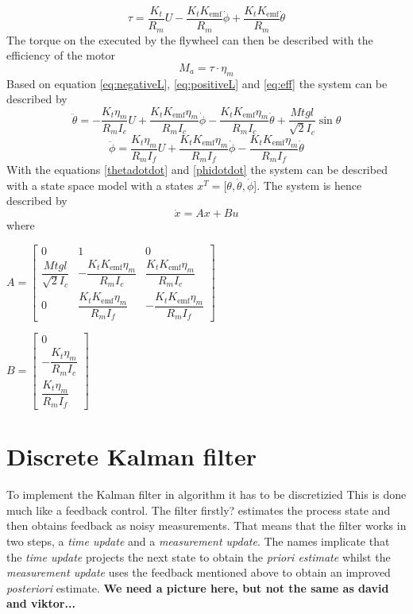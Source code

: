 \documentclass[a4paper,11pt]{kth-mag}
\begin{document}
\begin{equation} \label{eq:tau}
\tau = \frac{K_t}{R_m} U - \frac{K_t K_{\text{emf}} }{R_m} \dot{\phi} + \frac{K_t K_{\text{emf}} }{R_m} \dot{\theta}
\end{equation}
The torque on the executed by the flywheel can then be described with the efficiency of the motor
\begin{equation} \label{eq:eff}
M_a = \tau \cdot \eta_m
\end{equation}
Based on equation \eqref{eq:negativeL}, \eqref{eq:positiveL} and \eqref{eq:eff} the system can be described by
\begin{equation}
\ddot{\theta} = -\frac{K_t \eta_m}{R_m I_c} U + \frac{K_t K_{\text{emf}} \eta_m}{R_m I_c} \dot{\phi} - \frac{K_t K_{\text{emf}} \eta_m}{R_m I_c} \dot{\theta} + \frac{Mt g l }{\sqrt{2} I_c} \sin \theta \label{thetadotdot}
\end{equation}
\begin{equation}
\ddot{\phi} = \frac{K_t \eta_m}{R_m I_f} U + \frac{K_t K_{\text{emf}} \eta_m}{R_m I_f} \dot{\phi} - \frac{K_t K_{\text{emf}} \eta_m}{R_m I_f} \dot{\theta} 
\label{phidotdot}
\end{equation} 
With the equations \eqref{thetadotdot} and \eqref{phidotdot} the system can be described with a state space model with a states $x^T = [\theta, \dot{\theta}, \dot{\phi}$]. The system is hence described by
\begin{equation}
\dot{x} = Ax + Bu
\end{equation} 
where \\
\begin{center}
$A =\begin{bmatrix}
0 & 1 & 0 \\
\dfrac{Mt g l }{\sqrt{2} I_c} & - \dfrac{K_t K_{\text{emf}} \eta_m}{R_m I_c} & \dfrac{K_t K_{\text{emf}} \eta_m}{R_m I_c} \\ 
0 & \dfrac{K_t K_{\text{emf}} \eta_m}{R_m I_f} & -\dfrac{K_t K_{\text{emf}} \eta_m}{R_m I_f}
\end{bmatrix}$

$B = \begin{bmatrix}
0 \\ 
-\dfrac{K_t \eta_m}{R_m I_c} \\
\dfrac{K_t \eta_m}{R_m I_f}
\end{bmatrix} $
\end{center}

\section{Discrete Kalman filter} \label{sec: discrete kalman}
To implement the Kalman filter in algorithm it has to be discretizied 
This is done much like a feedback control. The filter firstly? estimates the process state and then obtains feedback as noisy measurements. That means that the filter works in two steps, a \textit{time update} and a \textit{measurement update}. The names implicate that the \textit{time update} projects the next state to obtain the \textit{priori estimate} whilst the \textit{measurement update} uses the feedback mentioned above to obtain an improved \textit{posteriori} estimate.
\textbf{We need a picture here, but not the same as david and viktor...}
\end{document}
